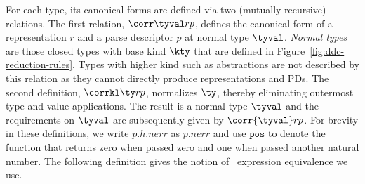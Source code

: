 


For each \ddc{} type, its canonical forms are defined via
two (mutually recursive) relations.  The first
relation, $\corr \tyval r p$,
defines the canonical form of a representation $r$ and a parse
descriptor $p$ at normal type $\tyval$.  {\em Normal types}
are those closed types with base kind $\kty$ that are defined in 
Figure~\ref{fig:ddc-reduction-rules}.  Types with higher kind such as
abstractions are not described by this relation as they cannot directly
produce representations and PDs.  
The second definition, $\corrkl \ty r p$,
normalizes $\ty$, thereby eliminating outermost type and value
applications.  The result is a normal type $\tyval$ and the
requirements on $\tyval$ are subsequently given by $\corr {\tyval} r
p$.  For brevity in these definitions, we write $p.h.{nerr}$ as
$p.{nerr}$ and use $\mathtt{pos}$ to denote the function that returns
zero when passed zero and one when passed another natural number.  The
following definition gives the notion of \fomega\ expression
equivalence we use.



